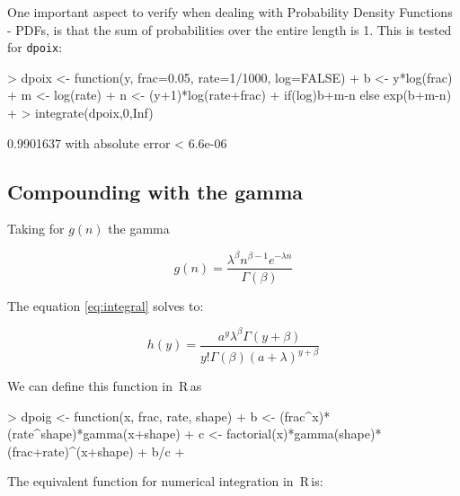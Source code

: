 \documentclass{article}
\newcommand{\R}{{\sf \,R\,}}
\newcommand{\code}[1]{\texttt{#1}}
\begin{document}
One important aspect to verify when dealing with Probability Density Functions - PDFs, is that the sum of probabilities over the entire length is 1. This is tested for \code{dpoix}:

\begin{Schunk}
\begin{Sinput}
> dpoix <- function(y, frac=0.05, rate=1/1000, log=FALSE) {  
+     b <- y*log(frac)
+ 	  m <- log(rate)
+ 	  n <- (y+1)*log(rate+frac)
+     if(log)b+m-n else exp(b+m-n)
+ }
> integrate(dpoix,0,Inf)
\end{Sinput}
\begin{Soutput}
0.9901637 with absolute error < 6.6e-06
\end{Soutput}
\end{Schunk}


\subsection*{Compounding with the gamma}

 
Taking for $g(n)$ the gamma

\begin{equation}
\label{eq:gamma}
  g(n) = \frac{ \lambda^{\beta} n^{\beta-1} e^{- \lambda n} }{ \Gamma(\beta) }
\end{equation}

The equation \ref{eq:integral} solves to:

\begin{equation}
  \label{eq:poig}
  h(y) = \frac{a^y \lambda^\beta \Gamma(y+\beta)}{y!\Gamma(\beta)(a+\lambda)^{y+\beta}}
\end{equation}

We can define this function in \R as

\begin{Schunk}
\begin{Sinput}
> dpoig <- function(x, frac, rate, shape) {  
+   b <- (frac^x)*(rate^shape)*gamma(x+shape)
+   c <- factorial(x)*gamma(shape)*(frac+rate)^(x+shape)
+   b/c
+ }
\end{Sinput}
\end{Schunk}

The equivalent function for numerical integration in \R is:

\begin{Schunk}
\end{Schunk}
\end{document}
